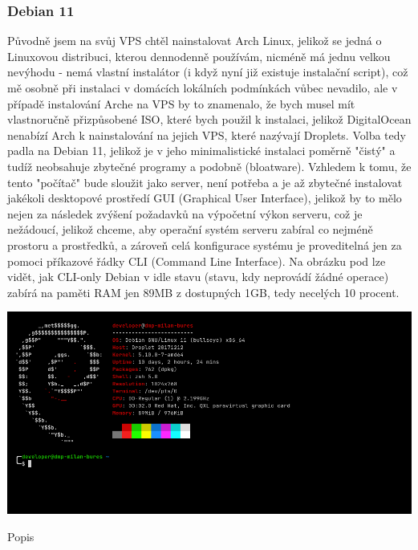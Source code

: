 \documentclass[12pt,a4paper]{report}
\begin{document}
  \subsubsection{Debian 11}
  Původně jsem na svůj VPS chtěl nainstalovat Arch Linux, jelikož se jedná o Linuxovou distribuci, kterou dennodenně používám, nicméně má jednu velkou
  nevýhodu - nemá vlastní instalátor (i když nyní již existuje instalační script), což mě osobně při
  instalaci v domácích lokálních podmínkách vůbec nevadilo, ale v případě instalování Arche na VPS
  by to znamenalo, že bych musel mít vlastnoručně přizpůsobené ISO, které bych použil k instalaci,
  jelikož DigitalOcean nenabízí Arch k nainstalování na jejich VPS, které nazývají Droplets.
  Volba tedy padla na Debian 11, jelikož je v jeho minimalistické instalaci poměrně "čistý" a tudíž
  neobsahuje zbytečné programy a podobně (bloatware). Vzhledem k tomu, že tento "počítač" bude
  sloužit jako server, není potřeba a je až zbytečné instalovat jakékoli desktopové prostředí GUI
  (Graphical User Interface), jelikož by to mělo nejen za následek zvýšení požadavků na výpočetní
  výkon serveru, což je nežádoucí, jelikož chceme, aby operační systém serveru zabíral co nejméně
  prostoru a prostředků, a zároveň celá konfigurace systému je proveditelná jen za pomoci
  příkazové řádky CLI (Command Line Interface). Na obrázku pod lze vidět, jak CLI-only Debian v idle
  stavu (stavu, kdy neprovádí žádné operace) zabírá na paměti RAM jen 89MB z dostupných 1GB,
  tedy necelých 10 procent.

  \vspace*{0.5cm}
  \noindent\includegraphics[width=\linewidth]{VPS.png}
  \begin{center}
    Popis
  \end{center}
  \vspace*{0.5cm}
\end{document}
